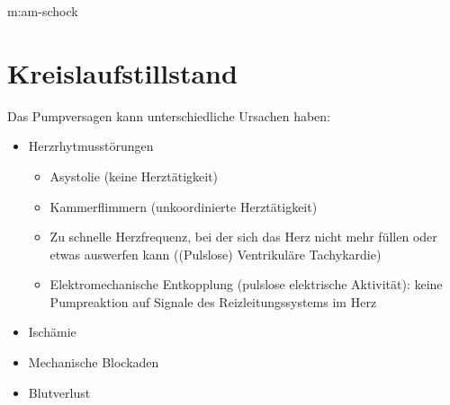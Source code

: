 \label{topic:schockbekaempfung}



{m:am-schock}
{
}{}






\section{Kreislaufstillstand}
\label{bkm:RefHeading42514602}
\label{topic:kreislaufstillstand}


{\TxBeschreibung}
{%
Das Pumpversagen kann unterschiedliche Ursachen haben:
\begin{itemize}
  \item Herzrhytmusstörungen
  \begin{itemize}
    \item Asystolie (keine Herztätigkeit)
    \item Kammerflimmern (unkoordinierte Herztätigkeit)
    \item Zu schnelle Herzfrequenz, bei der sich das Herz
    nicht mehr füllen oder etwas auswerfen kann ((Pulslose)
    Ventrikuläre Tachykardie)
    \item Elektromechanische
    Entkopplung (pulslose elektrische Aktivität): keine
    Pumpreaktion auf Signale des Reizleitungssystems im Herz
  \end{itemize}
  \item Ischämie
  \item Mechanische Blockaden
  \item Blutverlust
\end{itemize}
}
{}
{}
{}
{}

